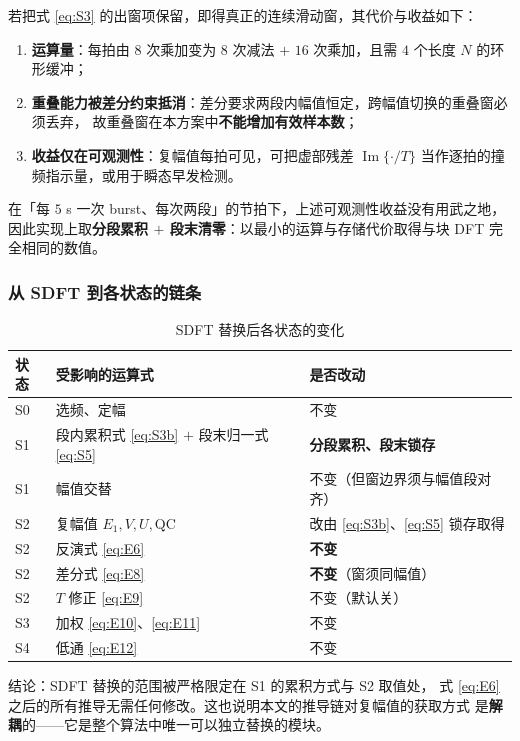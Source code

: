 \documentclass[11pt,a4paper]{ctexart}
\begin{document}
若把式 \eqref{eq:S3} 的出窗项保留，即得真正的连续滑动窗，其代价与收益如下：

\begin{enumerate}
\item \textbf{运算量}：每拍由 $8$ 次乘加变为 $8$ 次减法 $+$ $16$ 次乘加，且需 $4$ 个长度 $N$ 的环形缓冲；
\item \textbf{重叠能力被差分约束抵消}：差分要求两段内幅值恒定，跨幅值切换的重叠窗必须丢弃，
故重叠窗在本方案中\textbf{不能增加有效样本数}；
\item \textbf{收益仅在可观测性}：复幅值每拍可见，可把虚部残差 $\operatorname{Im}\{\cdot/T\}$
当作逐拍的撞频指示量，或用于瞬态早发检测。
\end{enumerate}

在「每 $5$ s 一次 burst、每次两段」的节拍下，上述可观测性收益没有用武之地，
因此实现上取\textbf{分段累积 $+$ 段末清零}：以最小的运算与存储代价取得与块 DFT 完全相同的数值。

\subsubsection*{从 SDFT 到各状态的链条}

\begin{table}[H]
\centering
\caption{SDFT 替换后各状态的变化}
\label{tab:sdftmap}
\begin{tabular}{lll}
\toprule
状态 & 受影响的运算式 & 是否改动\\
\midrule
S0 & 选频、定幅 & 不变\\
S1 & 段内累积式 \eqref{eq:S3b} $+$ 段末归一式 \eqref{eq:S5} & \textbf{分段累积、段末锁存}\\
S1 & 幅值交替 & 不变（但窗边界须与幅值段对齐）\\
S2 & 复幅值 $E_1,V,U,\mathrm{QC}$ & 改由 \eqref{eq:S3b}、\eqref{eq:S5} 锁存取得\\
S2 & 反演式 \eqref{eq:E6} & \textbf{不变}\\
S2 & 差分式 \eqref{eq:E8} & \textbf{不变}（窗须同幅值）\\
S2 & $T$ 修正 \eqref{eq:E9} & 不变（默认关）\\
S3 & 加权 \eqref{eq:E10}、\eqref{eq:E11} & 不变\\
S4 & 低通 \eqref{eq:E12} & 不变\\
\bottomrule
\end{tabular}
\end{table}

结论：SDFT 替换的范围被严格限定在 S1 的累积方式与 S2 取值处，
式 \eqref{eq:E6} 之后的所有推导无需任何修改。这也说明本文的推导链对复幅值的获取方式
是\textbf{解耦}的——它是整个算法中唯一可以独立替换的模块。
\end{document}
